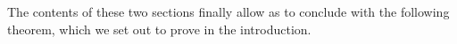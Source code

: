 


The contents of these two sections finally allow as to conclude with the following theorem, which we set out to prove in the introduction. 

